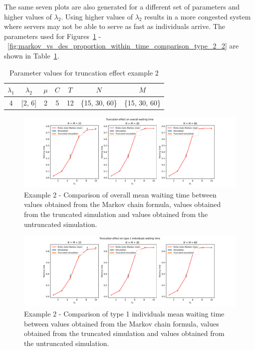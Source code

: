 The same seven plots are also generated for a different set of parameters and
higher values of \(\lambda_2\).
Using higher values of \(\lambda_2\) results in a more congested system
where servers may not be able to serve as fast as individuals arrive.
The parameters used for
Figures~\ref{fig:markov_vs_des_waiting_time_comparison_overall_2}
-~\ref{fig:markov_vs_des_proportion_within_time_comparison_type_2_2} are shown
in Table~\ref{tab:truncation_effect_example_2}.

\begin{table}[H]
    \centering
    \caption{Parameter values for truncation effect example \(2\)}
    \begin{tabular}{||c|c|c|c|c|c|c||}
        \hline
        \(\lambda_1\) & \(\lambda_2\) & \(\mu\) & \(C\) & \(T\) & \(N\) & \(M\) \\
        \hline
        4 & [2, 6] & 2 & 5 & 12 & \{15, 30, 60\} & \{15, 30, 60\} \\
        \hline
    \end{tabular}
    \label{tab:truncation_effect_example_2}
\end{table}

\begin{figure}[H]
    \includegraphics[width=\textwidth]{chapters/03_queueing_model/Bin/numeric_results_and_timings/truncation_effect_2/waiting_time_overall.pdf}
    \caption{
        Example 2 - Comparison of overall mean waiting time between values
        obtained from the
        Markov chain formula, values obtained from the truncated simulation and
        values obtained from the untruncated simulation.
    }
    \label{fig:markov_vs_des_waiting_time_comparison_overall_2}
\end{figure}


\begin{figure}[H]
    \includegraphics[width=\textwidth]{chapters/03_queueing_model/Bin/numeric_results_and_timings/truncation_effect_2/waiting_time_type_1.pdf}
    \caption{
        Example 2 - Comparison of type 1 individuals mean waiting time
        between values
        obtained from the Markov chain formula, values obtained from the
        truncated simulation and values obtained from the untruncated
        simulation.
    }
    \label{fig:markov_vs_des_waiting_time_comparison_type_1_2}
\end{figure}

